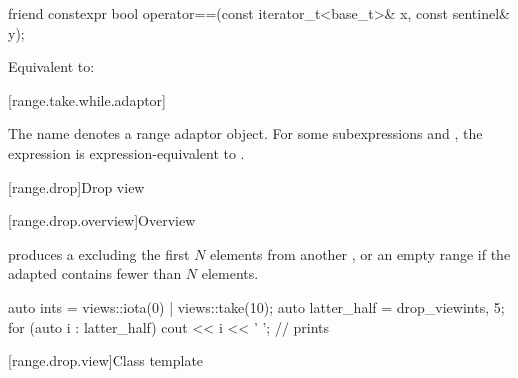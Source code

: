 %
\begin{itemdecl}
friend constexpr bool operator==(const iterator_t<base_t>& x, const sentinel& y);
\end{itemdecl}

\begin{itemdescr}
\pnum
\effects
Equivalent to:
\end{itemdescr}

[range.take.while.adaptor]{}

%
\pnum
The name  denotes
a range adaptor object.
For some subexpressions  and ,
the expression 
is expression-equivalent to .

[range.drop]{Drop view}

[range.drop.overview]{Overview}

\pnum
{} produces a 
excluding the first $N$ elements from another , or
an empty range if the adapted  contains fewer than $N$ elements.

\pnum
\begin{example}
\begin{codeblock}
auto ints = views::iota(0) | views::take(10);
auto latter_half = drop_view{ints, 5};
for (auto i : latter_half) {
  cout << i << ' ';                             // prints 
}
\end{codeblock}
\end{example}

[range.drop.view]{Class template }

